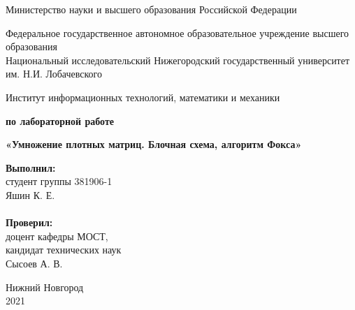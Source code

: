 \documentclass{report}
\begin{document}
\begin{titlepage}

\begin{center}
Министерство науки и высшего образования Российской Федерации
\end{center}

\begin{center}
Федеральное государственное автономное образовательное учреждение высшего образования \\
Национальный исследовательский Нижегородский государственный университет им. Н.И. Лобачевского
\end{center}

\begin{center}
Институт информационных технологий, математики и механики
\end{center}

\vspace{4em}

\begin{center}
\textbf{ по лабораторной работе} \\
\end{center}
\begin{center}
\textbf{\Large«Умножение плотных матриц. Блочная схема, алгоритм Фокса»} \\
\end{center}

\vspace{4em}

\newbox{\lbox}
\newlength{\maxl}
\setlength{\maxl}{\wd\lbox}
\hfill\parbox{7cm}{
\hspace*{5cm}\hspace*{-5cm}\textbf{Выполнил:} \\ студент группы 381906-1 \\ Яшин К. Е.\\
\\
\hspace*{5cm}\hspace*{-5cm}\textbf{Проверил:}\\ доцент кафедры МОСТ, \\ кандидат технических наук \\ Сысоев А. В.\\
}
\vspace{\fill}

\begin{center} Нижний Новгород \\ 2021 \end{center}

\end{titlepage}
\end{document}
